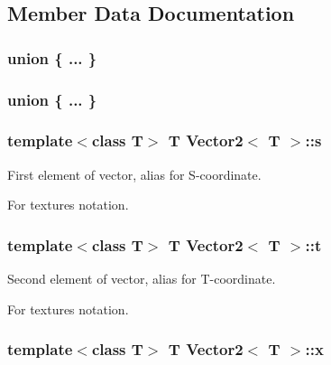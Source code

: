 \subsection{Member Data Documentation}
\hypertarget{class_vector2_a8bdebf8de631b7bbe921bbbfae68b576}{
\subsubsection[{"@1}]{\setlength{\rightskip}{0pt plus 5cm}union \{ ... \} }}
\label{class_vector2_a8bdebf8de631b7bbe921bbbfae68b576}
\hypertarget{class_vector2_adcb8def47b076a4aa09b62adf6b2f60f}{
\subsubsection[{"@3}]{\setlength{\rightskip}{0pt plus 5cm}union \{ ... \} }}
\label{class_vector2_adcb8def47b076a4aa09b62adf6b2f60f}
\hypertarget{class_vector2_a4855e78bb8bc73048d7871e414047ecc}{
\subsubsection[{s}]{\setlength{\rightskip}{0pt plus 5cm}template$<$class T$>$ T {\bf Vector2}$<$ T $>$::{\bf s}}}
\label{class_vector2_a4855e78bb8bc73048d7871e414047ecc}


First element of vector, alias for S-\/coordinate. 

For textures notation. \hypertarget{class_vector2_afdb6c2a84434bb86bd5e8a92a546c91a}{
\subsubsection[{t}]{\setlength{\rightskip}{0pt plus 5cm}template$<$class T$>$ T {\bf Vector2}$<$ T $>$::{\bf t}}}
\label{class_vector2_afdb6c2a84434bb86bd5e8a92a546c91a}


Second element of vector, alias for T-\/coordinate. 

For textures notation. \hypertarget{class_vector2_a78fa1f2ed5e261c7fbeb8f3536a1ee34}{
\subsubsection[{x}]{\setlength{\rightskip}{0pt plus 5cm}template$<$class T$>$ T {\bf Vector2}$<$ T $>$::{\bf x}}}
\label{class_vector2_a78fa1f2ed5e261c7fbeb8f3536a1ee34}


